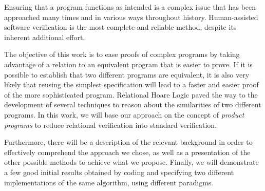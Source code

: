 

Ensuring that a program functions as intended is a complex issue that has been approached many times and in various ways throughout history.
Human-assisted software verification is the most complete and reliable method, despite its inherent additional effort.

The objective of this work is to ease proofs of complex programs by taking advantage of a relation to an equivalent program that is easier to prove.
If it is possible to establish that two different programs are equivalent, it is also very likely that reusing the simplest specification will lead to a faster and easier proof of the more sophisticated program.
Relational Hoare Logic paved the way to the development of several techniques to reason about the similarities of two different programs.
In this work, we will base our approach on the concept of \emph{product programs} to reduce relational verification into standard verification.

Furthermore, there will be a description of the relevant background in order to effectively comprehend the approach we chose, as well as a presentation of the other possible methods to achieve what we propose.
Finally, we will demonstrate a few good initial results obtained by coding and specifying two different implementations of the same algorithm, using different paradigms.


